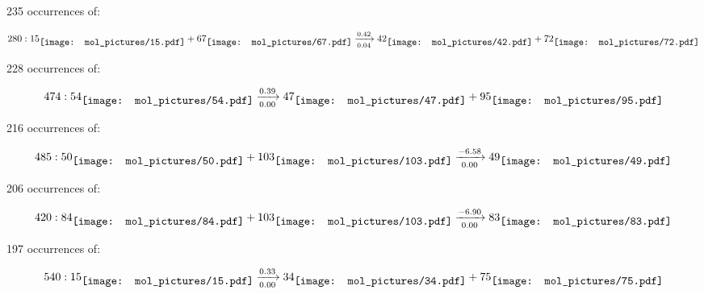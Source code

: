 \documentclass{article}
\begin{document}
\vspace{1cm}


235 occurrences of:

$$
280:  
15
\raisebox{-.5\height}{\texttt{[image: mol\_pictures/15.pdf]}}
+
67
\raisebox{-.5\height}{\texttt{[image: mol\_pictures/67.pdf]}}
\xrightarrow[0.04]{0.42}
42
\raisebox{-.5\height}{\texttt{[image: mol\_pictures/42.pdf]}}
+
72
\raisebox{-.5\height}{\texttt{[image: mol\_pictures/72.pdf]}}
$$



\vspace{1cm}


228 occurrences of:

$$
474:  
54
\raisebox{-.5\height}{\texttt{[image: mol\_pictures/54.pdf]}}
\xrightarrow[0.00]{0.39}
47
\raisebox{-.5\height}{\texttt{[image: mol\_pictures/47.pdf]}}
+
95
\raisebox{-.5\height}{\texttt{[image: mol\_pictures/95.pdf]}}
$$



\vspace{1cm}


216 occurrences of:

$$
485:  
50
\raisebox{-.5\height}{\texttt{[image: mol\_pictures/50.pdf]}}
+
103
\raisebox{-.5\height}{\texttt{[image: mol\_pictures/103.pdf]}}
\xrightarrow[0.00]{-6.58}
49
\raisebox{-.5\height}{\texttt{[image: mol\_pictures/49.pdf]}}
$$



\vspace{1cm}


206 occurrences of:

$$
420:  
84
\raisebox{-.5\height}{\texttt{[image: mol\_pictures/84.pdf]}}
+
103
\raisebox{-.5\height}{\texttt{[image: mol\_pictures/103.pdf]}}
\xrightarrow[0.00]{-6.90}
83
\raisebox{-.5\height}{\texttt{[image: mol\_pictures/83.pdf]}}
$$



\vspace{1cm}


197 occurrences of:

$$
540:  
15
\raisebox{-.5\height}{\texttt{[image: mol\_pictures/15.pdf]}}
\xrightarrow[0.00]{0.33}
34
\raisebox{-.5\height}{\texttt{[image: mol\_pictures/34.pdf]}}
+
75
\raisebox{-.5\height}{\texttt{[image: mol\_pictures/75.pdf]}}
$$
\end{document}

